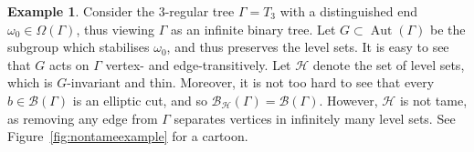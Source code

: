 \documentclass[11pt,a4paper]{amsart}
\DeclareMathOperator{\Aut}{Aut}
\theoremstyle{definition}
\newtheorem{example}[theorem]{Example}
\newcommand{\per}{\mathcal{H}}
\newcommand{\br}{{\mathscr{B}}}
\begin{document}
\begin{example}\label{exa:not-tame}
    Consider the 3-regular tree $\Gamma = T_3$ with a distinguished end $\omega_0 \in \Omega(\Gamma)$, thus viewing $\Gamma$ as an infinite binary tree.
    Let $G \subset \Aut(\Gamma)$ be the subgroup which stabilises $\omega_0$, and thus preserves the level sets. It is easy to see that $G$ acts on $\Gamma$ vertex- and edge-transitively. 
    Let $\per$ denote the set of level sets, which is $G$-invariant and thin. Moreover, it is not too hard to see that every $b \in \br(\Gamma)$ is an elliptic cut, and so $\br_\per(\Gamma) = \br(\Gamma)$. However, $\per$ is not tame, as removing any edge from $\Gamma$ separates vertices in infinitely many level sets. See Figure~\ref{fig:nontameexample} for a cartoon.
    \begin{figure}[h]
         \centering



\begin{tikzpicture}[x=0.75pt,y=0.75pt,yscale=-1,xscale=1]


\end{tikzpicture}
\end{figure}
\end{example}
\end{document}
